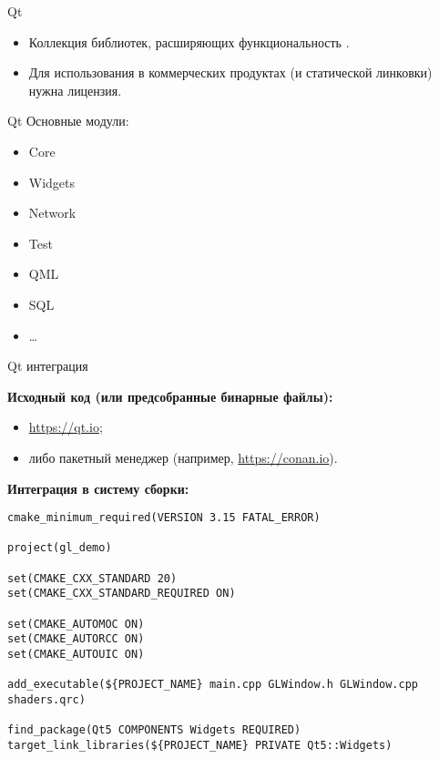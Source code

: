 \documentclass{beamer}
\begin{document}
\begin{frame}[fragile]{Qt}
    \begin{itemize}
        \item Коллекция библиотек, расширяющих функциональность \langcpp.
        \item Для использования в коммерческих продуктах (и статической линковки) нужна лицензия.
    \end{itemize}
\end{frame}

\begin{frame}[fragile]{Qt}
    Основные модули:
    \begin{itemize}
        \item Core
        \item Widgets
        \item Network
        \item Test
        \item QML
        \item SQL
        \item \dots
    \end{itemize}
\end{frame}

\begin{frame}[fragile]{Qt интеграция}

    {\bf Исходный код (или предсобранные бинарные файлы):}
    \begin{itemize}
        \item \url{https://qt.io};
        \item либо пакетный менеджер (например, \url{https://conan.io}).
    \end{itemize}

    {\bf Интеграция в систему сборки:}
    \small
    \begin{lstlisting}
cmake_minimum_required(VERSION 3.15 FATAL_ERROR)

project(gl_demo)

set(CMAKE_CXX_STANDARD 20)
set(CMAKE_CXX_STANDARD_REQUIRED ON)

set(CMAKE_AUTOMOC ON)
set(CMAKE_AUTORCC ON)
set(CMAKE_AUTOUIC ON)

add_executable(${PROJECT_NAME} main.cpp GLWindow.h GLWindow.cpp shaders.qrc)

find_package(Qt5 COMPONENTS Widgets REQUIRED)
target_link_libraries(${PROJECT_NAME} PRIVATE Qt5::Widgets)
    \end{lstlisting}
\end{frame}
\end{document}
